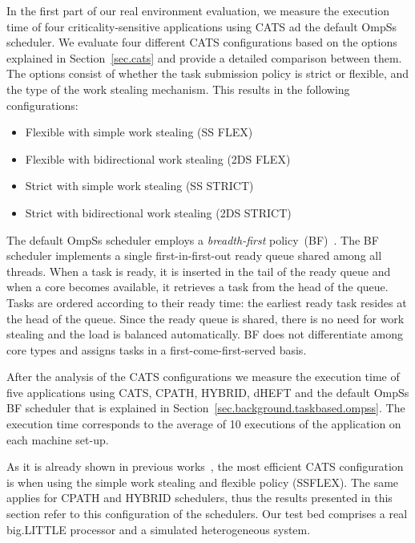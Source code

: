 In the first part of our real environment evaluation, we measure the execution time of four criticality-sensitive applications using CATS ad the default OmpSs scheduler. 
We evaluate four different CATS configurations based on the options explained in Section~\ref{sec.cats} and provide a detailed comparison between them. 
The options consist of whether the task submission policy is strict or flexible, and the type of the work stealing mechanism. 
This results in the following configurations:
\begin{itemize}
	\itemsep0em
	\item Flexible with simple work stealing (SS FLEX)
	\item Flexible with bidirectional work stealing (2DS FLEX)
	\item Strict with simple work stealing (SS STRICT)
	\item Strict with bidirectional work stealing (2DS STRICT)
\end{itemize}

The default OmpSs scheduler employs a \textit{breadth-first} policy~(BF)~\cite{Duran_schedulers_08}. The BF scheduler implements a single first-in-first-out ready queue shared among all threads. 
When a task is ready, it is inserted in the tail of the ready queue and when a core becomes available, it retrieves a task from the head of the queue. Tasks are ordered according to their ready time: the earliest ready task resides at the head of the queue. Since the ready queue is shared, there is no need for work stealing and the load is balanced automatically. BF does not differentiate among core types and assigns tasks in a first-come-first-served basis.

After the analysis of the CATS configurations we measure the execution time of five applications using CATS, CPATH, HYBRID, dHEFT and the default OmpSs BF scheduler that is explained in Section~\ref{sec.background.taskbased.ompss}. 
The execution time corresponds to the average of 10 executions of the application on each machine set-up.

As it is already shown in previous works~\cite{Chronaki:ICS2015}, the most efficient CATS configuration is when using the simple work stealing and flexible policy (SSFLEX).
The same applies for CPATH and HYBRID schedulers, thus the results presented in this section refer to this configuration of the schedulers. 
\fi %
Our test bed comprises a real big.LITTLE processor and a simulated heterogeneous system.

